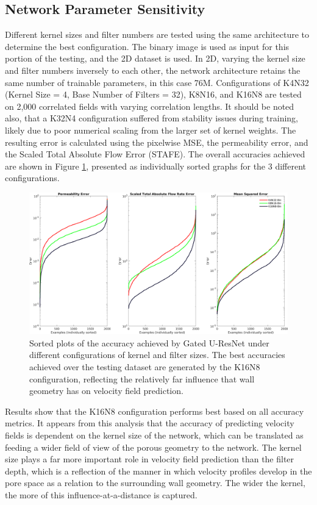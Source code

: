 \documentclass{article}
\begin{document}
\subsection{Network Parameter Sensitivity}
\label{sec:kernelsAndFilters}
Different kernel sizes and filter numbers are tested using the same architecture to determine the best configuration. The binary image is used as input for this portion of the testing, and the 2D dataset is used. In 2D, varying the kernel size and filter numbers inversely to each other, the network architecture retains the same number of trainable parameters, in this case 76M. Configurations of K4N32 (Kernel Size = 4, Base Number of Filters = 32), K8N16, and K16N8 are tested on 2,000 correlated fields with varying correlation lengths. It should be noted also, that a K32N4 configuration suffered from stability issues during training, likely due to poor numerical scaling from the larger set of kernel weights. The resulting error is calculated using the pixelwise MSE, the permeability error, and the Scaled Total Absolute Flow Error (STAFE). The overall accuracies achieved are shown in Figure \ref{fig:configCompare}, presented as individually sorted graphs for the 3 different configurations.

\begin{figure}[htp!]
  \centering
    \includegraphics[width=\textwidth]{./figures/velCNNsParamCompare3.png}
    \caption{Sorted plots of the accuracy achieved by Gated U-ResNet under different configurations of kernel and filter sizes. The best accuracies achieved over the testing dataset are generated by the K16N8 configuration, reflecting the relatively far influence that wall geometry has on velocity field prediction.}
    \label{fig:configCompare}
\end{figure}

Results show that the K16N8 configuration performs best based on all accuracy metrics. It appears from this analysis that the accuracy of predicting velocity fields is dependent on the kernel size of the network, which can be translated as feeding a wider field of view of the porous geometry to the network. The kernel size plays a far more important role in velocity field prediction than the filter depth, which is a reflection of the manner in which velocity profiles develop in the pore space as a relation to the surrounding wall geometry. The wider the kernel, the more of this influence-at-a-distance is captured.
\end{document}
